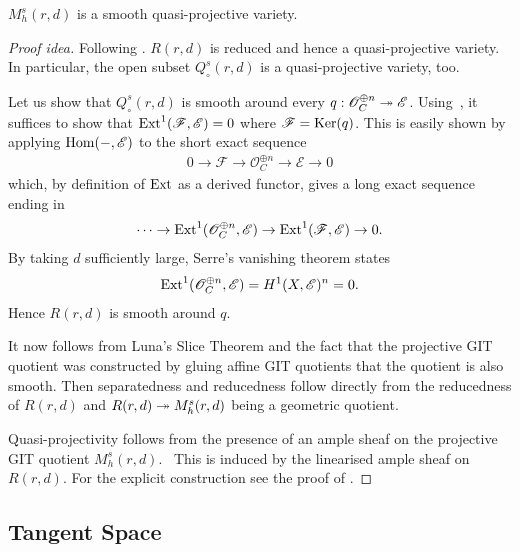 \documentclass[12pt]{ociamthesis}  %
\begin{document}
\begin{theorem}\label{thm:lf_are_smooth}
  $M^s_h(r,d)$ is a smooth quasi-projective variety.
  \begin{proof}[Proof idea]
    Following \cite[Proposition 8.65]{hoskins2016}.
    $R(r,d)$ is reduced and hence a quasi-projective variety.
    In particular, the open subset $Q^s_\circ(r,d)$ is a quasi-projective
    variety, too.

    Let us show that $Q^s_\circ(r,d)$ is smooth around every
    $q : \mathscr O^{\oplus n}_C \twoheadrightarrow \mathscr E$. Using~\cite[Proposition 2.2.8]{huybrechts2010}, it suffices
    to show that $\operatorname{Ext}^1(\mathscr F,\mathscr E)=0$ where
    $\mathscr F = \operatorname{Ker}(q)$. This is easily shown by applying
    $\operatorname{Hom}(-,\mathscr E)$ to the short exact sequence
    \begin{align*}
      0 \to \mathscr F \to \mathscr O^{\oplus n}_C \to \mathscr E \to 0
    \end{align*}
    which, by definition of $\operatorname{Ext}$ as a derived functor, gives a
    long exact sequence ending in
    \begin{align*}
      \cdots
      \to \operatorname{Ext}^1(\mathscr O^{\oplus n}_C,\mathscr E)
      \to \operatorname{Ext}^1(\mathscr F,\mathscr E)
      \to 0.
    \end{align*}
    By taking $d$ sufficiently large, Serre's vanishing theorem
    states
    \begin{align*}
      \operatorname{Ext}^1(\mathscr O^{\oplus n}_C,\mathscr E) = H^1(X,\mathscr E)^n = 0.
    \end{align*}
    Hence $R(r,d)$ is smooth around $q$.

    It now follows from Luna's Slice Theorem and the fact that the
    projective GIT quotient was constructed by gluing affine GIT quotients
    that the quotient is also smooth. Then separatedness and reducedness
    follow directly from the reducedness of $R(r,d)$ and
    $R(r,d)\twoheadrightarrow M^s_h(r,d)$ being a geometric quotient.

    Quasi-projectivity follows from the presence of an ample
    sheaf on the projective GIT quotient $M^s_h(r,d)$.~\cite[\href{https://stacks.math.columbia.edu/tag/0B42}{Tag 0B42}]{stacks-project}
    This is induced by the linearised ample sheaf on $R(r,d)$.
    For the explicit construction see the proof of
    \cite[Theorem 8.1]{dolgachev2003}.
  \end{proof}
\end{theorem}

\subsection{Tangent Space}
\end{document}
